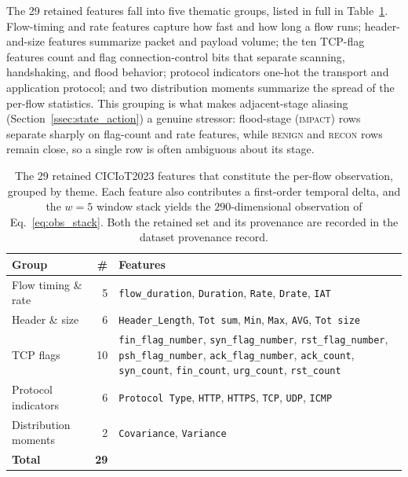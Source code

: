 The 29 retained features fall into five thematic groups, listed in full in Table~\ref{tab:feature_groups}. Flow-timing and rate features capture how fast and how long a flow runs; header-and-size features summarize packet and payload volume; the ten TCP-flag features count and flag connection-control bits that separate scanning, handshaking, and flood behavior; protocol indicators one-hot the transport and application protocol; and two distribution moments summarize the spread of the per-flow statistics. This grouping is what makes adjacent-stage aliasing (Section~\ref{ssec:state_action}) a genuine stressor: flood-stage (\textsc{impact}) rows separate sharply on flag-count and rate features, while \textsc{benign} and \textsc{recon} rows remain close, so a single row is often ambiguous about its stage.

\begin{table}[!htbp]
\centering
\caption[The 29 retained observation features by thematic group.]{The 29 retained CICIoT2023 features that constitute the per-flow observation, grouped by theme. Each feature also contributes a first-order temporal delta, and the $w = 5$ window stack yields the $290$-dimensional observation of Eq.~\eqref{eq:obs_stack}. Both the retained set and its provenance are recorded in the dataset provenance record.}
\label{tab:feature_groups}
\small
\begin{tabularx}{\textwidth}{lrX}
\toprule
\textbf{Group} & \textbf{\#} & \textbf{Features} \\
\midrule
Flow timing \& rate    & 5  & \texttt{flow\_duration}, \texttt{Duration}, \texttt{Rate}, \texttt{Drate}, \texttt{IAT} \\
Header \& size         & 6  & \texttt{Header\_Length}, \texttt{Tot sum}, \texttt{Min}, \texttt{Max}, \texttt{AVG}, \texttt{Tot size} \\
TCP flags              & 10 & \texttt{fin\_flag\_number}, \texttt{syn\_flag\_number}, \texttt{rst\_flag\_number}, \texttt{psh\_flag\_number}, \texttt{ack\_flag\_number}, \texttt{ack\_count}, \texttt{syn\_count}, \texttt{fin\_count}, \texttt{urg\_count}, \texttt{rst\_count} \\
Protocol indicators    & 6  & \texttt{Protocol Type}, \texttt{HTTP}, \texttt{HTTPS}, \texttt{TCP}, \texttt{UDP}, \texttt{ICMP} \\
Distribution moments   & 2  & \texttt{Covariance}, \texttt{Variance} \\
\midrule
\textbf{Total}         & \textbf{29} & \\
\bottomrule
\end{tabularx}
\end{table}

